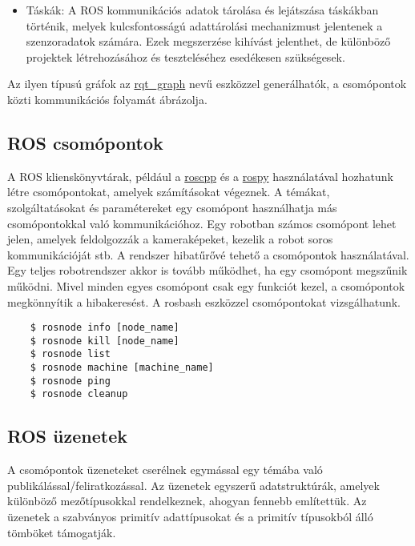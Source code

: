 \documentclass{article}
\begin{document}
\begin{itemize}
    \item Táskák: A ROS kommunikációs adatok tárolása és lejátszása táskákban történik, melyek kulcsfontosságú adattárolási mechanizmust jelentenek a szenzoradatok számára. Ezek megszerzése kihívást jelenthet, de különböző projektek létrehozásához és teszteléséhez esedékesen szükségesek.
\end{itemize}
Az ilyen típusú gráfok az \href{http://wiki.ros.org/rqt_graph}{rqt\_graph} nevű eszközzel generálhatók, a csomópontok közti kommunikációs folyamát ábrázolja.

\subsection{ROS csomópontok}
A ROS klienskönyvtárak, például a \href{http://wiki.ros.org/roscpp}{roscpp} és a \href{http://wiki.ros.org/rospy}{rospy} használatával hozhatunk létre csomópontokat, amelyek számításokat végeznek. A témákat, szolgáltatásokat és paramétereket egy csomópont használhatja más csomópontokkal való kommunikációhoz. Egy robotban számos csomópont lehet jelen, amelyek feldolgozzák a kameraképeket, kezelik a robot soros kommunikációját stb. A rendszer hibatűrővé tehető a csomópontok használatával. Egy teljes robotrendszer akkor is tovább működhet, ha egy csomópont megszűnik működni. Mivel minden egyes csomópont csak egy funkciót kezel, a csomópontok megkönnyítik a hibakeresést.
A rosbash eszközzel csomópontokat vizsgálhatunk.
\begin{verbatim}
    $ rosnode info [node_name]
    $ rosnode kill [node_name]
    $ rosnode list
    $ rosnode machine [machine_name]
    $ rosnode ping
    $ rosnode cleanup
\end{verbatim}



\subsection{ROS üzenetek}
A csomópontok üzeneteket cserélnek egymással egy témába való publikálással/feliratkozással. Az üzenetek egyszerű adatstruktúrák, amelyek különböző mezőtípusokkal rendelkeznek, ahogyan fennebb említettük. Az üzenetek a szabványos primitív adattípusokat és a primitív típusokból álló tömböket támogatják.
\begin{comment}
A szolgáltatáshívások egy másik módszer, amellyel a csomópontok kommunikálhatnak. A szolgáltatások üzenetek, és az srv fájl tartalmazza az egyes szolgáltatási üzenettípusok definícióit.    
\end{comment}
\end{document}

